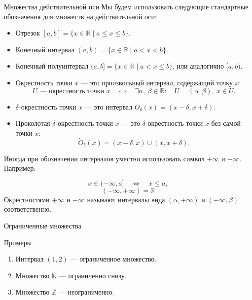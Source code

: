 \documentclass[8pt]{beamer}
\begin{document}
\begin{frame}{Множества действительной оси}
Мы будем использовать следующие стандартные обозначения для множеств на действительной оси:

\begin{itemize}
\item Отрезок $[a,b]=\{ x\in \mathbb{R} \mid a \le x \le b\}$.
\item Конечный интервал $(a,b)=\{ x\in \mathbb{R} \mid a < x < b\}$.
\item Конечный полуинтервал $(a,b]=\{ x\in \mathbb{R} \mid a < x \le b\}$, или аналогично $[a,b)$.
\item Окрестность точки $x$ --- это произвольный интервал, содержащий точку $x$:
$$U \text{ --- окрестность точки $x$}\quad \iff \quad \exists \alpha,\ \beta\in\mathbb{R}:\quad U=(\alpha,\beta),\ x\in U.$$
\item $\delta$-окрестность точки $x$ --- это интервал $O_\delta(x)=(x-\delta, x+\delta)$.
\item Проколотая $\delta$-окрестность точки $x$ --- это $\delta$-окрестность точки $x$ без самой точки $x$:
$$\dot O_\delta(x)=(x-\delta,x) \cup (x, x+\delta).$$
\end{itemize}
\pause
Иногда при обозначении интервалов уместно использовать символ $+\infty$ и $-\infty$. Например:

$$x\in (-\infty , a] \quad \Leftrightarrow \quad x\le a,$$
$$(-\infty, +\infty) = \mathbb{R}$$
Окрестностями $+\infty$ и $-\infty$ называют интервалы вида $(\alpha,+\infty)$ и $(-\infty,\beta)$ соответственно.
\end{frame}

\begin{frame}{Ограниченные множества}
\pause
\begin{block}{Примеры}
\begin{enumerate}
\item Интервал $(1,2)$ --- ограниченное множество.
\item Множество $\mathbb{N}$ --- ограниченно  снизу.
\item Множество $\mathbb{Z}$ --- неограниченно.
\end{enumerate}
\end{block}
\end{frame}
\end{document}
